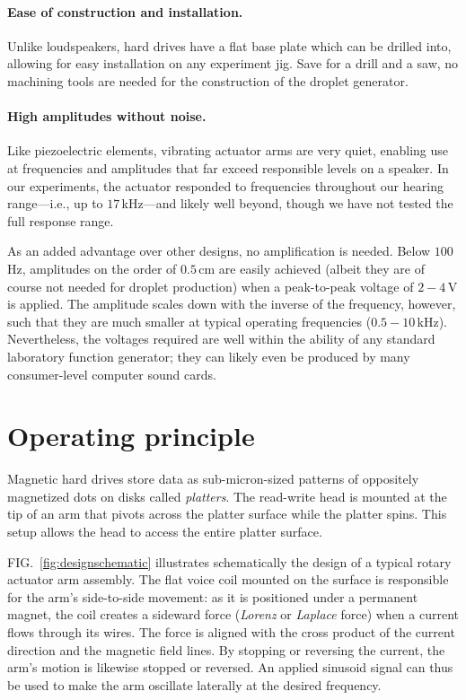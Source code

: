\documentclass[aip,rsi,reprint,graphicx]{revtex4-1} %
\begin{document}
\paragraph*{Ease of construction and installation.} Unlike loudspeakers, hard
drives have a flat base plate which can be drilled into, allowing for easy
installation on any experiment jig. Save for a drill and a saw, no machining
tools are needed for the construction of the droplet generator.

\paragraph*{High amplitudes without noise.}
Like piezoelectric elements, vibrating actuator arms are very quiet, enabling
use at frequencies and amplitudes that far exceed responsible levels on
a speaker.  In our experiments, the actuator responded to frequencies throughout
our hearing range---i.e., up to $17\,$kHz---and likely well beyond, though we
have not tested the full response range.

As an added advantage over other designs, no amplification is needed. Below
$100\,$Hz, amplitudes on the order of $0.5\,$cm are easily achieved (albeit they
are of course not needed for droplet production) when a peak-to-peak voltage of
$2-4\,$V is applied. The amplitude scales down with the inverse of the frequency,
however, such that they are much smaller at typical operating frequencies
($0.5-10\,$kHz). Nevertheless, the voltages required are well within the ability
of any standard laboratory function generator; they can likely even be produced by many
consumer-level computer sound cards.

\section{Operating principle}
Magnetic hard drives store data as sub-micron-sized patterns of 
oppositely magnetized dots on disks called \emph{platters}. The read-write head
is mounted at the tip of an arm that pivots across the platter surface while the
platter spins. This setup allows the head to access the entire platter surface.

FIG.~\ref{fig:designschematic} illustrates schematically the design of a typical
rotary actuator arm assembly. The flat voice coil mounted on the surface is responsible
for the arm's side-to-side movement: as it is positioned under a permanent
magnet, the coil creates a sideward force (\emph{Lorenz} or \emph{Laplace}
force) when a current flows through its wires. The force is aligned with the
cross product of the current direction and the magnetic field lines. By stopping
or reversing the current, the arm's motion is likewise stopped or reversed. An
applied sinusoid signal can thus be used to make the arm oscillate laterally at
the desired frequency.
\end{document}
